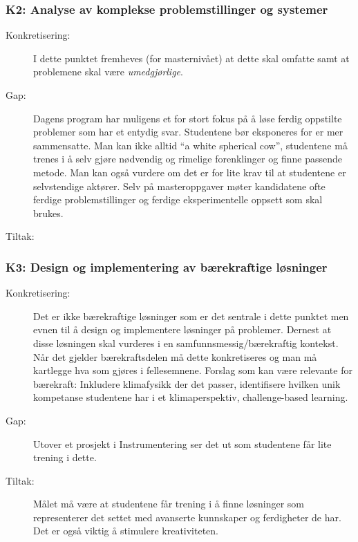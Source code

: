\subsubsection{K2: Analyse av komplekse problemstillinger og systemer}
\begin{description}
\item[Konkretisering:] I dette punktet fremheves (for masternivået) at dette skal omfatte  samt at problemene skal være \emph{umedgjørlige}. 
\item[Gap:] Dagens program har muligens et for stort fokus på å løse ferdig oppstilte problemer som har et entydig svar. Studentene bør eksponeres for er mer sammensatte. Man kan ikke alltid \enquote{a white spherical cow}, studentene må trenes i å selv gjøre nødvendig og rimelige forenklinger og finne passende metode. Man kan også vurdere om det er for lite krav til at studentene er selvstendige aktører. Selv på masteroppgaver møter kandidatene ofte ferdige problemstillinger og ferdige eksperimentelle oppsett som skal brukes.
\item[Tiltak:] 
\end{description}

\subsubsection{K3: Design og implementering av bærekraftige løsninger}
\begin{description}
\item[Konkretisering:]Det er ikke bærekraftige løsninger som er det sentrale i dette punktet men evnen til å design og implementere løsninger på problemer. Dernest at disse løsningen skal vurderes i en samfunnsmessig/bærekraftig kontekst. Når det gjelder bærekraftsdelen må dette konkretiseres og man må kartlegge hva som gjøres i fellesemnene. Forslag som kan være relevante for bærekraft: Inkludere klimafysikk der det passer, identifisere hvilken unik kompetanse studentene har i et klimaperspektiv, challenge-based learning.
\item[Gap:]Utover et prosjekt i Instrumentering ser det ut som studentene får lite trening i dette.
\item[Tiltak:]Målet må være at studentene får trening i å finne løsninger som representerer det settet med avanserte kunnskaper og ferdigheter de har. Det er også viktig å stimulere kreativiteten.
\end{description}

